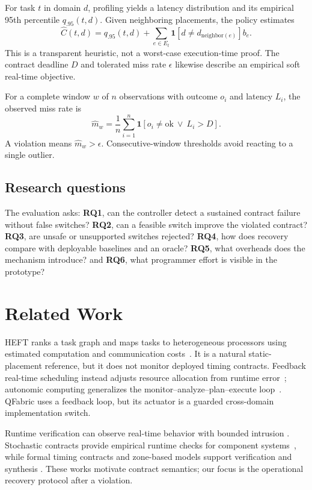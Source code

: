 \documentclass[conference]{IEEEtran}
\newcommand{\system}{QFabric\xspace}
\begin{document}
For task $t$ in domain $d$, profiling yields a latency distribution and its
empirical 95th percentile $q_{.95}(t,d)$. Given neighboring placements, the
policy estimates
\begin{equation}
 \widehat C(t,d)=q_{.95}(t,d)+
 \sum_{e\in E_t}\mathbf{1}[d\ne d_{\mathrm{neighbor}(e)}]b_e .
 \label{eq:cost}
\end{equation}
This is a transparent heuristic, not a worst-case execution-time proof. The
contract deadline $D$ and tolerated miss rate $\epsilon$ likewise describe an
empirical soft real-time objective.

For a complete window $w$ of $n$ observations with outcome $o_i$ and latency
$L_i$, the observed miss rate is
\begin{equation}
 \widehat m_w=\frac{1}{n}\sum_{i=1}^{n}
 \mathbf{1}[o_i\ne\mathrm{ok}\ \lor\ L_i>D].
 \label{eq:miss}
\end{equation}
A violation means $\widehat m_w>\epsilon$. Consecutive-window thresholds avoid
reacting to a single outlier.

\subsection{Research questions}
The evaluation asks: \textbf{RQ1}, can the controller detect a sustained
contract failure without false switches? \textbf{RQ2}, can a feasible switch
improve the violated contract? \textbf{RQ3}, are unsafe or unsupported switches
rejected? \textbf{RQ4}, how does recovery compare with deployable baselines and
an oracle? \textbf{RQ5}, what overheads does the mechanism introduce? and
\textbf{RQ6}, what programmer effort is visible in the prototype?

\section{Related Work}
HEFT ranks a task graph and maps tasks to heterogeneous processors using
estimated computation and communication costs~\cite{topcuoglu2002heft}. It is a
natural static-placement reference, but it does not monitor deployed timing
contracts. Feedback real-time scheduling instead adjusts resource allocation
from runtime error~\cite{lu2002feedback}; autonomic computing generalizes the
monitor--analyze--plan--execute loop~\cite{kephart2003autonomic}. \system uses a
feedback loop, but its actuator is a guarded cross-domain implementation switch.

Runtime verification can observe real-time behavior with bounded intrusion
\cite{reinbacher2014runtime}. Stochastic contracts provide empirical runtime
checks for component systems~\cite{nandi2015contracts}, while formal timing
contracts and zone-based models support verification and synthesis
\cite{alkhatib2016timing,camilli2018adaptive}. These works motivate contract
semantics; our focus is the operational recovery protocol after a violation.
\end{document}
